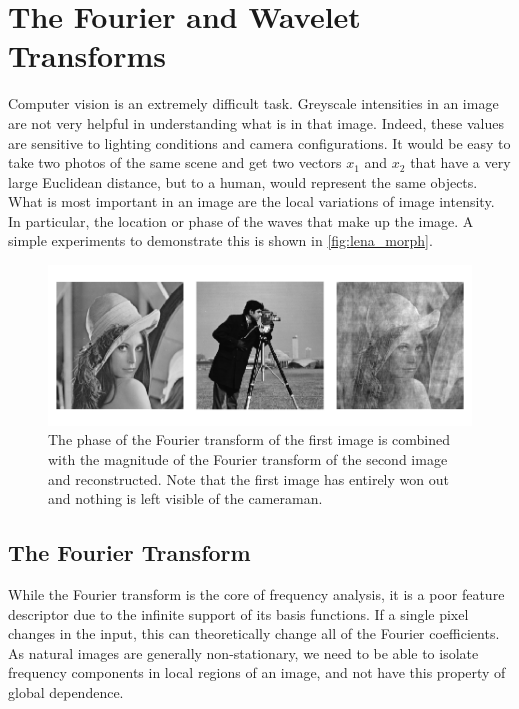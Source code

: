 \section{The Fourier and Wavelet Transforms}

  Computer vision is an extremely difficult task. Greyscale intensities in an image are
  not very helpful in understanding what is in that image. Indeed, these values are
  sensitive to lighting conditions and camera configurations. It would be easy to
  take two photos of the same scene and get two vectors $x_1$ and $x_2$ that have
  a very large Euclidean distance, but to a human, would represent the same
  objects. What is most important in an image are the local variations
  of image intensity. In particular, the location or phase of the waves that make
  up the image. A simple experiments to demonstrate this is shown in 
  \autoref{fig:lena_morph}. 

  \begin{figure}
    \centering
      \includegraphics[width=1.1\textwidth]{litreview/images/lena_mag_swap.png}
        {The phase of the Fourier transform of the first image is combined 
         with the magnitude of the Fourier
         transform of the second image and reconstructed. Note that the
         first image has entirely won out and nothing is left visible of
         the cameraman.}
      \label{fig:lena_morph}
  \end{figure}

\subsection{The Fourier Transform}
  While the Fourier transform is the core of frequency analysis, it is a poor
  feature descriptor due to the infinite support of its basis functions. If
  a single pixel changes in the input, this can theoretically change all of the
  Fourier coefficients. As natural images are generally non-stationary, we need
  to be able to isolate frequency components in local regions of an image, and
  not have this property of global dependence.


